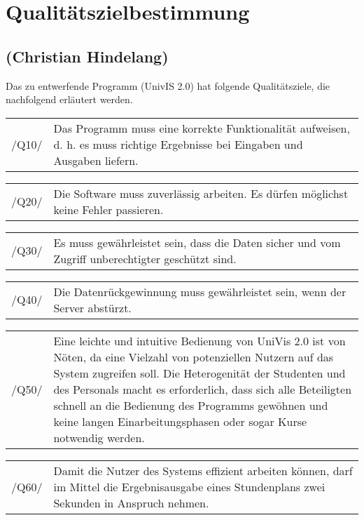 \section{Qualitätszielbestimmung}
\label{sec:Qualitätszielbestimmung}

\subsection*{(Christian Hindelang)}

Das zu entwerfende Programm (UnivIS 2.0) hat folgende Qualitätsziele, die nachfolgend erläutert werden. 

\begin{tabular}{p{1.5cm}p{14.5cm}}
 /Q10/	& Das Programm muss eine korrekte Funktionalität aufweisen, d. h. es muss richtige Ergebnisse bei Eingaben und Ausgaben liefern. \\[0.25cm]	 
\end{tabular}

\begin{tabular}{p{1.5cm}p{14.5cm}}
 /Q20/	& Die Software muss zuverlässig arbeiten. Es dürfen möglichst keine Fehler passieren. \\[0.25cm]	 
 
\end{tabular}
\begin{tabular}{p{1.5cm}p{14.5cm}}
 /Q30/	& Es muss gewährleistet sein, dass die Daten sicher und vom Zugriff unberechtigter geschützt sind. \\[0.25cm]	 
\end{tabular}

\begin{tabular}{p{1.5cm}p{14.5cm}}
 /Q40/	& Die Datenrückgewinnung muss gewährleistet sein, wenn der Server abstürzt. \\[0.25cm]	 
\end{tabular}

\begin{tabular}{p{1.5cm}p{14.5cm}}
 /Q50/	& Eine leichte und intuitive Bedienung von UniVis 2.0 ist von Nöten, da eine Vielzahl von potenziellen Nutzern auf das System zugreifen soll. Die Heterogenität der Studenten und des Personals macht es erforderlich, dass sich alle Beteiligten schnell an die Bedienung des Programms gewöhnen und keine langen Einarbeitungsphasen oder sogar Kurse notwendig werden. \\[0.25cm]	 
\end{tabular}

\begin{tabular}{p{1.5cm}p{14.5cm}}
 /Q60/	& Damit die Nutzer des Systems effizient arbeiten können, darf im Mittel die Ergebnisausgabe eines Stundenplans zwei Sekunden in Anspruch nehmen. \\[0.25cm]	 
\end{tabular}

